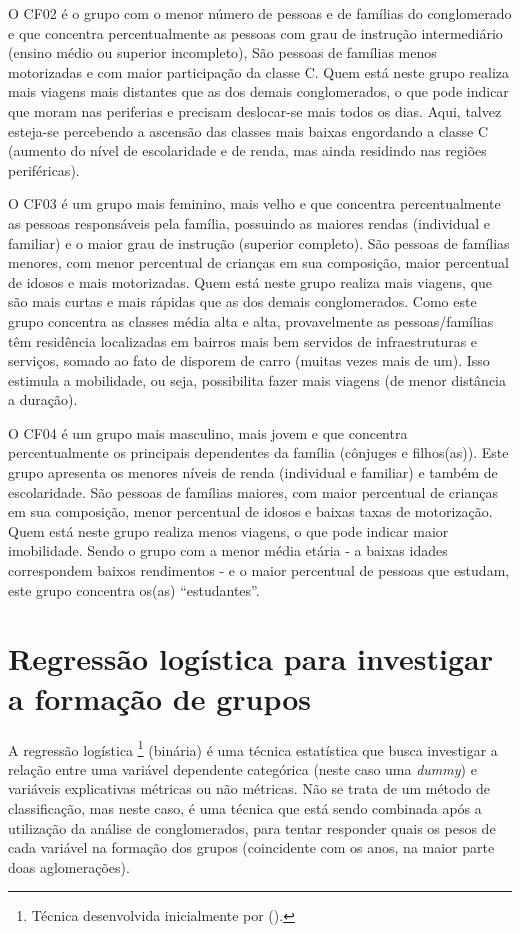 O CF02 é o grupo com o menor número de pessoas e de famílias do conglomerado e que concentra percentualmente as pessoas com grau de instrução intermediário (ensino médio ou superior incompleto), 
São pessoas de famílias menos motorizadas e com maior participação da classe C.
Quem está neste grupo realiza mais viagens mais distantes que as dos demais conglomerados, o que pode indicar que moram nas periferias e precisam deslocar-se mais todos os dias. 
Aqui, talvez esteja-se percebendo a ascensão das classes mais baixas engordando a classe C (aumento do nível de escolaridade e de renda, mas ainda residindo nas regiões periféricas).

O CF03 é um grupo mais feminino, mais velho e que concentra percentualmente as pessoas responsáveis pela família, possuindo as maiores rendas (individual e familiar) e o maior grau de instrução (superior completo). 
São pessoas de famílias menores, com menor percentual de crianças em sua composição, maior percentual de idosos e mais motorizadas.
Quem está neste grupo realiza mais viagens, que são mais curtas e mais rápidas que as dos demais conglomerados.
Como este grupo concentra as classes média alta e alta, provavelmente as pessoas/famílias têm residência localizadas em bairros mais bem servidos de infraestruturas e serviços, somado ao fato de disporem de carro (muitas vezes mais de um). Isso estimula a mobilidade, ou seja, possibilita fazer mais viagens (de menor distância a duração).

O CF04 é um grupo mais masculino, mais jovem e que concentra percentualmente os principais dependentes da família (cônjuges e filhos(as)). Este grupo apresenta os menores níveis de renda (individual e familiar) e também de escolaridade.
São pessoas de famílias maiores, com maior percentual de crianças em sua composição, menor percentual de idosos e baixas taxas de motorização.
Quem está neste grupo realiza menos viagens, o que pode indicar maior imobilidade.
Sendo o grupo com a menor média etária - a baixas idades correspondem baixos rendimentos - e o maior percentual de pessoas que estudam, este grupo concentra os(as) ``estudantes''.


\clearpage
\section{Regressão logística para investigar a formação de grupos}\label{sec:analises-reg-log}

A regressão logística
\footnote{Técnica desenvolvida inicialmente por  (\citeyear{COX1958}).}
 (binária) é uma técnica estatística que busca investigar a relação entre uma variável dependente categórica (neste caso uma \textit{dummy}) e variáveis explicativas métricas ou não métricas. Não se trata de um método de classificação, mas neste caso, é uma técnica que está sendo combinada após a utilização da análise de conglomerados, para tentar responder quais os pesos de cada variável na formação dos grupos (coincidente com os anos, na maior parte doas aglomerações).


